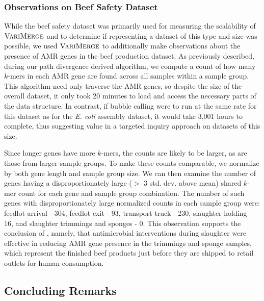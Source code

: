 \subsubsection{Observations on Beef Safety Dataset}

While the beef safety dataset was primarily used for measuring the scalability of $\mbox{\rm {\sc VariMerge}}$ and to determine if representing a dataset of this type and size was possible, we used $\mbox{\rm {\sc VariMerge}}$ to additionally make observations about the presence of AMR genes in the beef production dataset.  As previously described, during our path divergence derived algorithm, we compute a count of how many $k$-mers in each AMR gene are found across all samples within a sample group.  This algorithm need only traverse the AMR genes, so despite the size of the overall dataset, it only took 20 minutes to load and access the necessary parts of the data structure.  In contrast, if bubble calling were to run at the same rate for this dataset as for the \emph{E. coli} assembly dataset, it would take 3,001 hours to complete, thus suggesting value in a targeted inquiry approach on datasets of this size.

Since longer genes have more $k$-mers, the counts are likely to be larger, as are those from larger sample groups.  To make these counts comparable, we normalize by both gene length and sample group size.  We can then examine the number of genes having a disproportionately large ($>$ 3 std. dev. above mean) shared $k$-mer count for each gene and sample group combination.  The number of such genes with disproportionately large normalized counts in each sample group were:  feedlot arrival - 304, feedlot exit - 93, transport truck - 230, slaughter holding - 16, and slaughter trimmings and sponges - 0.
This observation supports the conclusion of \cite{noyes2016resistome}, namely, that antimicrobial interventions during slaughter were effective in reducing AMR gene presence in the trimmings and sponge samples, which represent the finished beef products just before they are shipped to retail outlets for human consumption.

\subsection{Concluding Remarks}
\label{sec:conclusion}


